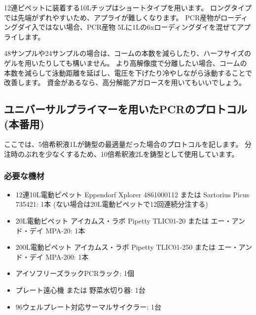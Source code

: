 \documentclass[titlepage,10pt,a4paper,uplatex]{jsbook}
\begin{document}
12連ピペットに装着する10{\textmu}Lチップはショートタイプを用います。
ロングタイプでは先端がずれやすいため、アプライが難しくなります。
PCR産物がローディングダイ入ではない場合、PCR産物 5{\textmu}Lに1{\textmu}Lの6xローディングダイを混ぜてアプライします。

48サンプルや24サンプルの場合は、コームの本数を減らしたり、ハーフサイズのゲルを用いたりしても構いません。
より高解像度で分離したい場合、コームの本数を減らして泳動距離を延ばし、電圧を下げたり冷やしながら泳動することで改善します。
資金があるなら、高分解能アガロースを用いてもいいでしょう。

\subsection{ユニバーサルプライマーを用いたPCRのプロトコル (本番用)}

ここでは、5倍希釈液1{\textmu}Lが鋳型の最適量だった場合のプロトコルを記します。
分注時のぶれを少なくするため、10倍希釈液2{\textmu}Lを鋳型として使用しています。

\subsubsection{必要な機材}
\begin{itemize}
\item 12連10{\textmu}L電動ピペット Eppendorf Xplorer 4861000112 または Sartorius Picus 735421: 1本 (ない場合は20{\textmu}L電動ピペットで12回連続分注する)
\item 20{\textmu}L電動ピペット アイカムス・ラボ Pipetty TLIC01-20 または エー・アンド・デイ MPA-20: 1本
\item 200{\textmu}L電動ピペット アイカムス・ラボ Pipetty TLIC01-250 または エー・アンド・デイ MPA-200: 1本
\item アイソフリーズラックPCRラック: 1個
\item プレート遠心機 または 野菜水切り器: 1台
\item 96ウェルプレート対応サーマルサイクラー: 1台
\end{itemize}
\end{document}
